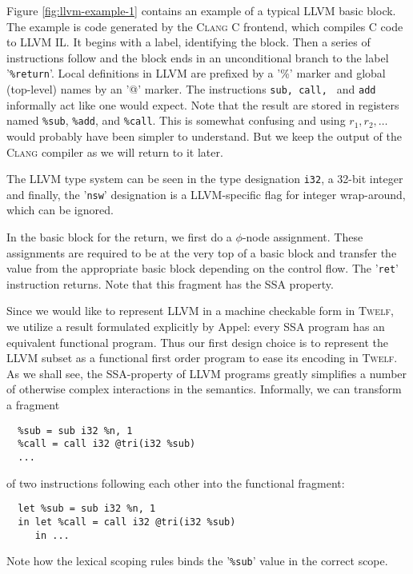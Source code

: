 \documentclass[a4paper, oneside, 10pt, draft]{memoir}
\newcommand{\clang}{\textsc{Clang}}
\newcommand{\twelf}{\textsc{Twelf}}
\begin{document}
Figure \ref{fig:llvm-example-1} contains an example of a typical LLVM
basic block. The example is code generated by the \clang{} C frontend,
which compiles C code to LLVM IL. It begins with a label, identifying
the block. Then a series of instructions follow and the block ends in
an unconditional branch to the label '\texttt{\%return}'. Local
definitions in LLVM are prefixed by a '\%' marker and global
(top-level) names by an '@' marker. The instructions \texttt{sub,
  call, } and \texttt{add} informally act like one would expect. Note
that the result are stored in registers named \texttt{\%sub},
\texttt{\%add}, and \texttt{\%call}. This is somewhat confusing and
using $r_1, r_2, \dotsc$ would probably have been simpler to
understand. But we keep the output of the \clang{} compiler as we will
return to it later.

The LLVM type system can be seen in the type designation \texttt{i32},
a 32-bit integer and finally, the '\texttt{nsw}' designation is a
LLVM-specific flag for integer wrap-around, which can be ignored.

In the basic block for the return, we first do a $\phi$-node
assignment. These assignments are required to be at the very top of a
basic block and transfer the value from the appropriate basic block
depending on the control flow. The '\texttt{ret}' instruction
returns. Note that this fragment has the SSA property.

Since we would like to represent LLVM in a machine checkable form in
\twelf{}, we utilize a result formulated explicitly by
Appel\cite{appel:1998:modern, appel:1998:ssa}: every SSA program has
an equivalent functional program. Thus our first design choice is to
represent the LLVM subset as a functional first order program to ease
its encoding in \twelf{}. As we shall see, the SSA-property of LLVM
programs greatly simplifies a number of otherwise complex interactions
in the semantics. Informally, we can transform a fragment
\label{llvm-consideration-let}
\begin{verbatim}
  %sub = sub i32 %n, 1
  %call = call i32 @tri(i32 %sub)
  ...
\end{verbatim}
of two instructions following each other into the functional fragment:
\begin{verbatim}
  let %sub = sub i32 %n, 1
  in let %call = call i32 @tri(i32 %sub)
     in ...
\end{verbatim}

Note how the lexical scoping rules binds the '\texttt{\%sub}' value
in the correct scope.
\end{document}
